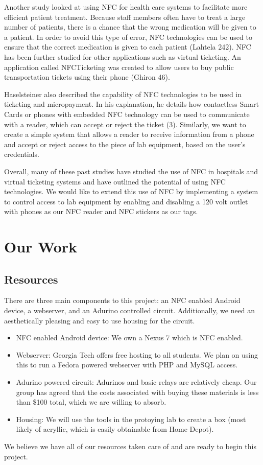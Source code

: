 \documentclass{sigchi}
\begin{document}
Another study looked at using NFC for health care systems to facilitate more efficient patient treatment. Because staff members often have to treat a large number of patients, there is a chance that the wrong medication will be given to a patient. In order to avoid this type of error, NFC technologies can be used to ensure that the correct medication is given to each patient (Lahtela 242). NFC has been further studied for other applications such as virtual ticketing. An application called NFCTicketing was created to allow users to buy public transportation tickets using their phone (Ghiron 46). 

Haselsteiner also described the capability of NFC technologies to be used in ticketing and micropayment. In his explanation, he details how contactless Smart Cards or phones with embedded NFC technology can be used to communicate with a reader, which can accept or reject the ticket (3). Similarly, we want to create a simple system that allows a reader to receive information from a phone and accept or reject access to the piece of lab equipment, based on the user’s credentials. 

Overall, many of these past studies have studied the use of NFC in hospitals and virtual ticketing systems and have outlined the potential of using NFC technologies. We would like to extend this use of NFC by implementing a system to control access to lab equipment by enabling and disabling a 120 volt outlet with phones as our NFC reader and NFC stickers as our tags.

\section{Our Work}

\subsection {Resources}
There are three main components to this project: an NFC enabled Android device, a webserver, and an Adurino controlled circuit. Additionally, we need an aesthetically pleasing and easy to use housing for the circuit.
\begin{itemize}
\item NFC enabled Android device: We own a Nexus 7 which is NFC enabled.
\item Webserver: Georgia Tech offers free hosting to all students. We plan on using this to run a Fedora powered webserver with PHP and MySQL access.
\item Adurino powered circuit: Adurinos and basic relays are relatively cheap. Our group has agreed that the costs associated with buying these materials is less than \$100 total, which we are willing to absorb.
\item Housing: We will use the tools in the protoying lab to create a box (most likely of acryllic, which is easily obtainable from Home Depot).
\end{itemize}
We believe we have all of our resources taken care of and are ready to begin this project.
\end{document}
